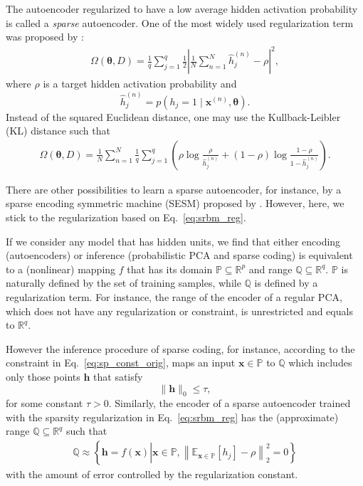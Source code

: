 \documentclass[dissertation,nocontribution,draft*]{aaltoseries}
\newcommand{\vect}[1]{\mathbf{#1}}
\newcommand{\vects}[1]{\boldsymbol{#1}}
\newcommand{\vh}[0]{\vect{h}}
\newcommand{\vx}[0]{\vect{x}}
\newcommand{\TT}[0]{{\vects{\theta}}}
\newcommand{\QQ}[0]{\mathbb{Q}}
\newcommand{\PP}[0]{\mathbb{P}}
\newcommand{\RR}[0]{\mathbb{R}}
\newcommand{\E}[0]{\mathbb{E}}
\begin{document}
The autoencoder regularized to have a low average hidden
activation probability is called a \textit{sparse}
autoencoder. One of the most widely used regularization term
was proposed by \citet{Lee2007}:
\begin{align}
    \label{eq:srbm_reg}
    \Omega(\TT, D) = \frac{1}{q} \sum_{j=1}^q \frac{1}{2} \left|
    \frac{1}{N} \sum_{n=1}^N \hat{h}_j^{(n)} - \rho
    \right|^2,
\end{align}
where $\rho$ is a target hidden activation probability and
\[
\hat{h}_j^{(n)} = p(h_j = 1 \mid \vx^{(n)}, \TT).
\]
Instead of the squared Euclidean distance, one may use the
Kullback-Leibler (KL) distance such that
\begin{align*}
    \Omega(\TT, D) = \frac{1}{N} \sum_{n=1}^N 
    \frac{1}{q} \sum_{j=1}^q \left( \rho \log
    \frac{\rho}{\hat{h}_j^{(n)}} + (1 - \rho) \log \frac{1 -
    \rho}{1 - \hat{h}_j^{(n)}} \right).
\end{align*}

There are other possibilities to learn a sparse autoencoder,
for instance, by a sparse encoding symmetric machine
(SESM)
proposed by \citet{Ranzato2008}. However, here, we stick to
the regularization based on Eq.~\eqref{eq:srbm_reg}.

If we consider any model that has hidden units, we find that
either encoding (autoencoders) or inference (probabilistic
PCA and sparse coding) is equivalent to a (nonlinear)
mapping $f$ that has its domain $\PP \subseteq \RR^p$
and range $\QQ \subseteq \RR^q$. $\PP$ is naturally defined
by the set of training samples, while $\QQ$ is defined by a
regularization term. For instance, the range of the encoder
of a regular PCA, which does not have any regularization or
constraint, is unrestricted and equals to $\RR^q$.

However the inference procedure of sparse
coding, for instance, according to the constraint in
Eq.~\eqref{eq:sp_const_orig}, maps an input $\vx \in \PP$ to
$\QQ$ which includes only those points $\vh$ that satisfy 
\[
\| \vh \|_0 \leq \tau,
\]
for some constant $\tau > 0$. Similarly, the encoder of a
sparse autoencoder trained with the sparsity regularization
in Eq.~\eqref{eq:srbm_reg} has the (approximate) range $\QQ
\subseteq \RR^q$ such that 
\begin{align}
    \label{eq:f_range}
    \QQ \approx \left\{\vh = f(\vx) \left| \vx \in \PP, \left\|
    \E_{\vx \in \PP}\left[ h_j \right] - \rho \right\|_2^2 =
    0 \right.\right\}
\end{align}
with the amount of error controlled by the regularization
constant.
\end{document}

